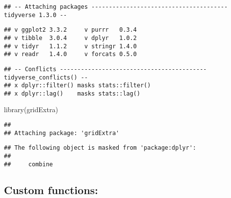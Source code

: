 \documentclass[
]{article}
\newenvironment{Shaded}{\begin{snugshade}}{\end{snugshade}}
\newcommand{\FunctionTok}[1]{\textcolor[rgb]{0.00,0.00,0.00}{#1}}
\newcommand{\NormalTok}[1]{#1}
\begin{document}
\begin{verbatim}
## -- Attaching packages --------------------------------------- tidyverse 1.3.0 --
\end{verbatim}

\begin{verbatim}
## v ggplot2 3.3.2     v purrr   0.3.4
## v tibble  3.0.4     v dplyr   1.0.2
## v tidyr   1.1.2     v stringr 1.4.0
## v readr   1.4.0     v forcats 0.5.0
\end{verbatim}

\begin{verbatim}
## -- Conflicts ------------------------------------------ tidyverse_conflicts() --
## x dplyr::filter() masks stats::filter()
## x dplyr::lag()    masks stats::lag()
\end{verbatim}

\begin{Shaded}
\begin{Highlighting}[]
\FunctionTok{library}\NormalTok{(gridExtra)}
\end{Highlighting}
\end{Shaded}

\begin{verbatim}
## 
## Attaching package: 'gridExtra'
\end{verbatim}

\begin{verbatim}
## The following object is masked from 'package:dplyr':
## 
##     combine
\end{verbatim}

\hypertarget{custom-functions}{%
\subsection{Custom functions:}\label{custom-functions}}
\end{document}
